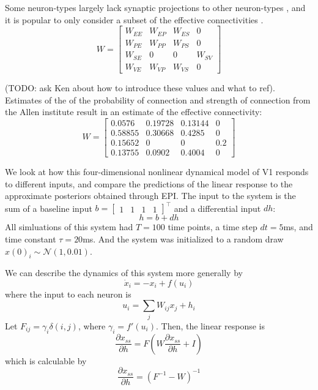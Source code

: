 \documentclass[11pt]{article}
\begin{document}
Some neuron-types largely lack synaptic projections to other neuron-types \cite{pfeffer2013inhibition}, and it is popular to only consider a subset of the effective connectivities \cite{litwin2016inhibitory}.
\begin{equation}
W = \begin{bmatrix} W_{EE} & W_{EP} & W_{ES} & 0 \\
                                W_{PE} & W_{PP} & W_{PS} & 0 \\
                                W_{SE} & 0 & 0 & W_{SV} \\
                                W_{VE} & W_{VP} &  W_{VS} &  0 \end{bmatrix}
\end{equation}

(TODO: ask Ken about how to introduce these values and what to ref).
Estimates of the of the probability of connection and strength of connection from the Allen institute result in an estimate of the effective connectivity: 
\begin{equation}
W = \begin{bmatrix} 0.0576 &  0.19728 & 0.13144 & 0 \\
                                0.58855 & 0.30668 & 0.4285 & 0 \\
                                0.15652 & 0 & 0 & 0.2 \\
                                0.13755 & 0.0902 &  0.4004 &  0 \end{bmatrix}
\end{equation}

We look at how this four-dimensional nonlinear dynamical model of V1 responds to different inputs, and compare the predictions of the linear response to the approximate posteriors obtained through EPI.  The input to the system is the sum of a baseline input $b = \begin{bmatrix} 1 & 1 & 1 & 1 \end{bmatrix}^\top$ and a differential input $dh$:
\begin{equation}
h = b + dh
\end{equation}
All simluations of this system had $T=100$ time points, a time step $dt = 5$ms, and time constant $\tau = 20$ms.  And the system was initialized to a random draw $x(0)_i \sim \mathcal{N}(1, 0.01)$.

We can describe the dynamics of this system more generally by
\begin{equation}
\dot{x}_i = -x_i + f(u_i)
\end{equation}
where the input to each neuron is
\begin{equation}
u_i = \sum_j W_{ij} x_j + h_i
\end{equation}
Let $F_{ij} = \gamma_i \delta(i,j)$, where $\gamma_i = f'(u_i)$.  Then, the linear response is
\begin{equation}
\frac{\partial x_{ss}}{\partial h} = F(W\frac{\partial x_{ss}}{\partial h} + I)
\end{equation}
which is calculable by
\begin{equation}
\frac{\partial x_{ss}}{\partial h} = (F^{-1} - W)^{-1}
\end{equation}
\end{document}
